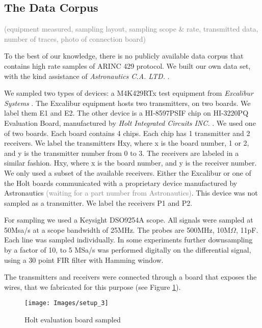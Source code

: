 \documentclass[conference]{IEEEtran}
\begin{document}
\subsection{The Data Corpus}
  \textcolor{gray}{(equipment measured, sampling layout, sampling scope \& rate, transmitted data, number of traces, photo of connection board)}
  
  To the best of our knowledge, there is no publicly available data corpus that contains high rate samples of ARINC 429 protocol. We built our own data set, with the kind assistance of \textit{Astronautics C.A. LTD.} \cite{}.
  
  We sampled two types of devices: a M4K429RTx test equipment from \textit{Excalibur Systems} \cite{}. The Excalibur equipment hosts two transmitters, on two boards. We label them E1 and E2. The other device is a HI-8597PSIF chip on HI-3220PQ Evaluation Board, manufactured by \textit{Holt Integrated Circuits INC.} \cite{}. We used one of two boards. Each board contains 4 chips. Each chip has 1 transmitter and 2 receivers. We label the transmitters H{x}{y}, where x is the board number, 1 or 2, and y is the transmitter number from 0 to 3. The receivers are labeled in a similar fashion. H{x}{y}, where x is the board number, and y is the receiver number. We only used a subset of the available receivers. Either the Excalibur or one of the Holt boards communicated with a proprietary device manufactured by Astronautics \textcolor{gray}{(waiting for a part number from Astronautics)}. This device was not sampled as a transmitter. We label the receivers P1 and P2.
  
  For sampling we used a Keysight DSO9254A scope. All signals were sampled at 50Msa/s at a scope bandwidth of 25MHz. The probes are 500MHz, 10M\(\Omega\), 11pF. Each line was sampled individually. In some experiments further downsampling by a factor of 10, to 5 MSa/s was performed digitally on the differential signal, using a 30 point FIR filter with Hamming window.
  
  The transmitters and receivers were connected through a board that exposes the wires, that we fabricated for this purpose (see Figure \ref{fig:SetupImage}).
  
  \begin{figure}[t]
    \centering
    \texttt{[image: Images/setup\_3]}
    \caption{Holt evaluation board sampled}
    \label{fig:SetupImage}
  \end{figure}
  
\end{document}

